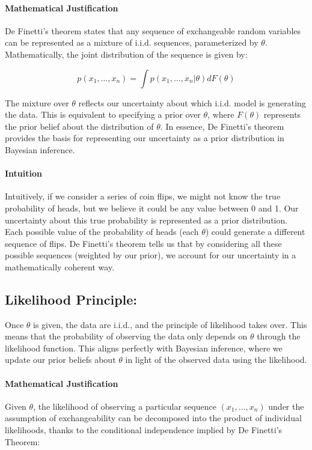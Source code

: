 \documentclass{article}
\begin{document}
\paragraph{Mathematical Justification}
De Finetti's theorem states that any sequence of exchangeable random variables can be represented as a mixture of i.i.d. sequences, parameterized by \( \theta \). Mathematically, the joint distribution of the sequence is given by:

\[
p(x_1, \ldots, x_n) = \int p(x_1, \ldots, x_n | \theta) dF(\theta)
\]

The mixture over \( \theta \) reflects our uncertainty about which i.i.d. model is generating the data. This is equivalent to specifying a prior over \( \theta \), where \( F(\theta) \) represents the prior belief about the distribution of \( \theta \). In essence, De Finetti's theorem provides the basis for representing our uncertainty as a prior distribution in Bayesian inference.

\paragraph{Intuition}
Intuitively, if we consider a series of coin flips, we might not know the true probability of heads, but we believe it could be any value between 0 and 1. Our uncertainty about this true probability is represented as a prior distribution. Each possible value of the probability of heads (each \( \theta \)) could generate a different sequence of flips. De Finetti's theorem tells us that by considering all these possible sequences (weighted by our prior), we account for our uncertainty in a mathematically coherent way.






\subsection{Likelihood Principle:}
    Once \( \theta \) is given, the data are i.i.d., and the principle of likelihood takes over. This means that the probability of observing the data only depends on \( \theta \) through the likelihood function. This aligns perfectly with Bayesian inference, where we update our prior beliefs about \( \theta \) in light of the observed data using the likelihood.
\paragraph{Mathematical Justification}
Given \( \theta \), the likelihood of observing a particular sequence \( (x_1, \ldots, x_n) \) under the assumption of exchangeability can be decomposed into the product of individual likelihoods, thanks to the conditional independence implied by De Finetti's Theorem:
\end{document}
